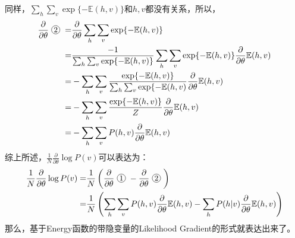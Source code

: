 \documentclass[a4paper]{article}
\newcommand*{\circled}[1]{\lower.7ex\hbox{\tikz\draw (0pt, 0pt)%
    circle (.5em) node {\makebox[1em][c]{\small #1}};}}
\begin{document}
同样，$\sum_h \sum_v \exp\{-\mathbb{E}(h,v)\}$和$h,v$都没有关系，所以，
\begin{equation}
    \begin{split}
        \frac{\partial }{\partial \theta} \circled{2} = & \frac{\partial }{\partial \theta}  \sum_h \sum_v \exp\{-\mathbb{E}(h,v)\} \\
        = & \frac{-1}{\sum_h \sum_v \exp\{-\mathbb{E}(h,v)\}} \sum_h \sum_v \exp\{-\mathbb{E}(h,v)\} \frac{\partial }{\partial \theta} \mathbb{E}(h,v) \\
        = & -\sum_h \sum_v \frac{\exp\{-\mathbb{E}(h,v)\}}{\sum_h \sum_v \exp\{-\mathbb{E}(h,v)} \frac{\partial }{\partial \theta} \mathbb{E}(h,v) \\
        = & -\sum_h \sum_v \frac{\exp\{-\mathbb{E}(h,v)\}}{Z} \frac{\partial }{\partial \theta} \mathbb{E}(h,v) \\
        = & -\sum_h \sum_v P(h,v) \frac{\partial }{\partial \theta} \mathbb{E}(h,v) \\
    \end{split}
\end{equation}
综上所述，$\frac{1}{N} \frac{\partial }{\partial \theta} \log P(v)$可以表达为：
\begin{equation}
\begin{split}
    \frac{1}{N} \frac{\partial }{\partial \theta} \log P(v) = & \frac{1}{N} \left( \frac{\partial }{\partial \theta} \circled{1} - \frac{\partial }{\partial \theta} \circled{2} \right)\\
    = &\frac{1}{N} \left( \sum_h \sum_v P(h,v) \frac{\partial }{\partial \theta} \mathbb{E}(h,v) - \sum_h P(h|v) \frac{\partial }{\partial \theta} \mathbb{E}(h,v)\right)
\end{split}
\end{equation}
那么，基于Energy函数的带隐变量的Likelihood Gradient的形式就表达出来了。
\end{document}
